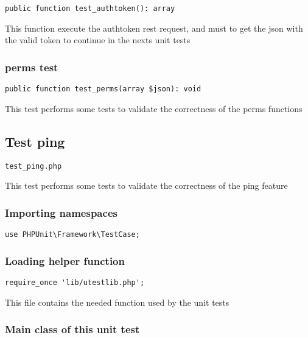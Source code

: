 \documentclass[a4paper]{article}
\begin{document}
\begin{lstlisting}
public function test_authtoken(): array
\end{lstlisting}

This function execute the authtoken rest request, and must to get the
json with the valid token to continue in the nexts unit tests

\hypertarget{toc300}{}
\subsubsection{perms test}

\begin{lstlisting}
public function test_perms(array $json): void
\end{lstlisting}

This test performs some tests to validate the correctness
of the perms functions

\hypertarget{toc301}{}
\subsection{Test ping}

\begin{lstlisting}
test_ping.php
\end{lstlisting}

This test performs some tests to validate the correctness
of the ping feature

\hypertarget{toc302}{}
\subsubsection{Importing namespaces}

\begin{lstlisting}
use PHPUnit\Framework\TestCase;
\end{lstlisting}

\hypertarget{toc303}{}
\subsubsection{Loading helper function}

\begin{lstlisting}
require_once 'lib/utestlib.php';
\end{lstlisting}

This file contains the needed function used by the unit tests

\hypertarget{toc304}{}
\subsubsection{Main class of this unit test}
\end{document}

